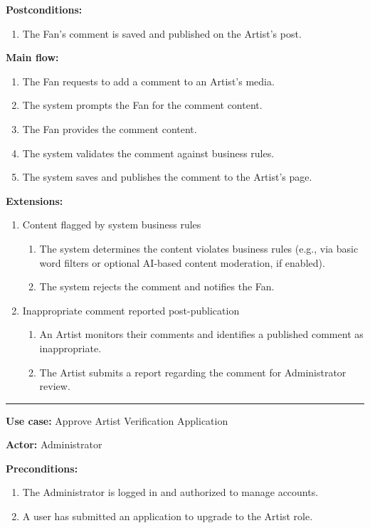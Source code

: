 \documentclass{article}
\begin{document}
{\bfseries Postconditions:}
\begin{enumerate}
	\item The Fan's comment is saved and published on the Artist's post.
\end{enumerate}

{\bfseries Main flow:}
\begin{enumerate}
	\item The Fan requests to add a comment to an Artist's media.
	\item The system prompts the Fan for the comment content.
	\item The Fan provides the comment content.
	\item The system validates the comment against business rules.
	\item The system saves and publishes the comment to the Artist's page.
\end{enumerate}

{\bfseries Extensions:}
\begin{enumerate}
	\item [4a.] Content flagged by system business rules
	\begin{enumerate}
		\item [4a1.] The system determines the content violates business rules (e.g., via basic word filters or optional AI-based content moderation, if enabled).
		\item [4a2.] The system rejects the comment and notifies the Fan.
	\end{enumerate}
	\item [5a.] Inappropriate comment reported post-publication
	\begin{enumerate}
		\item [5a1.] An Artist monitors their comments and identifies a published comment as inappropriate.
		\item [5a2.] The Artist submits a report regarding the comment for Administrator review.
	\end{enumerate}
\end{enumerate}


\hrule
\bigskip

{\bfseries Use case:} Approve Artist Verification Application

{\bfseries Actor:} Administrator

{\bfseries Preconditions:}
\begin{enumerate}
	\item The Administrator is logged in and authorized to manage accounts.
	\item A user has submitted an application to upgrade to the Artist role.
\end{enumerate}
\end{document}
